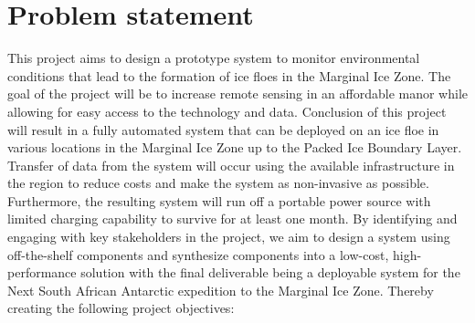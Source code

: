\section{Problem statement}
\label{subsec:ch1.section2}

This project aims to design a prototype system to monitor environmental conditions that lead to the formation of ice floes in the Marginal Ice Zone. The goal of the project will be to increase remote sensing in an affordable manor while allowing for easy access to the technology and data.  Conclusion of this project will result in a fully automated system that can be deployed on an ice floe in various locations in the Marginal Ice Zone up to the Packed Ice Boundary Layer. Transfer of data from the system will occur using the available infrastructure in the region to reduce costs and make the system as non-invasive as possible. Furthermore, the resulting system will run off a portable power source with limited charging capability to survive for at least one month. By identifying and engaging with key stakeholders in the project, we aim to design a system using off-the-shelf components and synthesize components into a low-cost, high-performance solution with the final deliverable being a deployable system for the Next South African Antarctic expedition to the Marginal Ice Zone.  Thereby creating the following project objectives:
